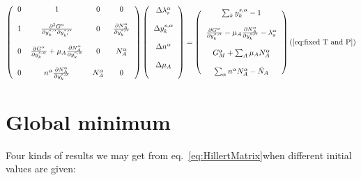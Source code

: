 \documentclass[12pt]{article}
\begin{document}
\[
\left(
\begin{tabular}{cccc}
 0 & 1 & 0 &0\\
\\
1 & $\frac{\partial^2 G^{\alpha}}{\partial y_k^{s, \alpha}\partial y_{k^{\prime}}^{s, \alpha}} $ &
0 & $\frac{\partial N^{\alpha}_{A}}{\partial y^{s, \alpha}_{k}}$ \\
\\
0 & $\frac{\partial G^{\alpha}}{\partial y_k^{s, \alpha}} +
\mu_{A}\frac{\partial N^{\alpha}_{A}}{\partial y^{s, \alpha}_{k}}$
& 0 & $N^{\alpha}_{A}$ \\
\\
 0 & $n^{\alpha}\frac{\partial N^{\alpha}_{A}}{\partial y^{s, \alpha}_{k}}$
 & $N^{\alpha}_{A}$ & 0 \\
\end{tabular}
\right)
\left(
\begin{tabular}{c}

$\Delta \lambda_s^{\alpha}$\\
\\
$\Delta y^{s, \alpha}_{k}$\\
\\
$\Delta n^{\alpha}$\\
\\
$\Delta \mu_{A}$\\
\\
\end{tabular}
\right)
=
\left(
\begin{tabular}{c}
$\sum_k y^{s, \alpha}_{k} - 1$\\
\\
$ \frac{\partial G^{\alpha}}{\partial y^{s, \alpha}_{k}}
- \mu_{A}\frac{\partial N^{\alpha}_{A}}{\partial y^{s, \alpha}_{k}}
- \lambda_s^{\alpha}$\\
\\
$G^{\alpha}_M + \sum_{A} \mu_{A} N^{\alpha}_{A}$\\
\\
$\sum_{\alpha}n^{\alpha}N^{\alpha}_{A} - \tilde N_{A}$\\
\end{tabular}
\right)
\\
\\ (\ref{eq:fixed T and P})
\]



\section{Global minimum}

Four kinds of results we may get from eq.~\ref{eq:HillertMatrix}when 
different initial values are given: 
\end{document}
